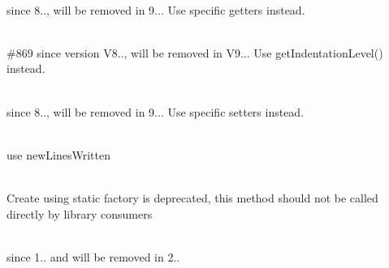\begin{DoxyRefList}
\item[Global \doxylink{class_sabberworm_1_1_c_s_s_1_1_output_format_afac4736708071dd243fd0ba5de1068c5}{Output\+Format\+::get} (\$s\+Name)]\hfill \\
\label{deprecated__deprecated000387}%
%
since 8.., will be removed in 9... Use specific getters instead.  
\item[Global \doxylink{class_sabberworm_1_1_c_s_s_1_1_output_format_a07d981f1dd3ffe78519d1786f60fa769}{Output\+Format\+::level} ()]\hfill \\
\label{deprecated__deprecated000389}%
%
\#869 since version V8.., will be removed in V9... Use {\ttfamily get\+Indentation\+Level()} instead.  
\item[Global \doxylink{class_sabberworm_1_1_c_s_s_1_1_output_format_a9c09b9b60719457acd3f5e9438978586}{Output\+Format\+::set} (\$a\+Names, \$m\+Value)]\hfill \\
\label{deprecated__deprecated000388}%
%
since 8.., will be removed in 9... Use specific setters instead.  
\item[Global \doxylink{class_illuminate_1_1_console_1_1_output_style_a8207469ed3a333ca774c9eb00a8ac6ee}{Output\+Style\+::new\+Line\+Written} ()]\hfill \\
\label{deprecated__deprecated000100}%
%
use new\+Lines\+Written  
\item[Global \doxylink{classphp_documentor_1_1_reflection_1_1_doc_block_1_1_tags_1_1_param_a698b22d43114cd3d0a208d8c1c269da0}{Param\+::create} (string \$body, ?\doxylink{classphp_documentor_1_1_reflection_1_1_type_resolver}{Type\+Resolver} \$type\+Resolver=null, ?\doxylink{classphp_documentor_1_1_reflection_1_1_doc_block_1_1_description_factory}{Description\+Factory} \$description\+Factory=null, ?Type\+Context \$context=null)]\hfill \\
\label{deprecated__deprecated000278}%
%
Create using static factory is deprecated, this method should not be called directly by library consumers  
\item[Global \doxylink{class_mockery_1_1_generator_1_1_parameter_a23ecbde357f7f6bde5a50f876334a74d}{Parameter\+::get\+Class} ()]\hfill \\
\label{deprecated__deprecated000167}%
%
since 1.. and will be removed in 2..  

\end{DoxyRefList}
